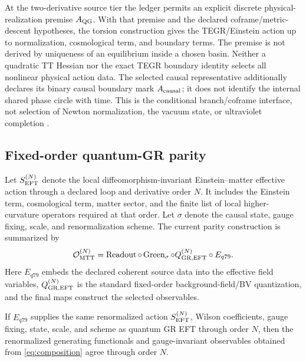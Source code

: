 \documentclass[11pt]{article}
\newcommand{\cO}{\mathcal{O}}
\begin{document}
At the two-derivative source tier the ledger permits an explicit discrete
physical-realization premise $A_{\rm QG}$. With that premise and the
declared coframe/metric-descent hypotheses, the torsion construction gives
the TEGR/Einstein action up to normalization, cosmological term, and
boundary terms. The premise is not derived by uniqueness of an equilibrium
inside a chosen basin. Neither a quadratic TT Hessian nor the exact
TEGR boundary identity selects all nonlinear physical action data.
The selected causal representative additionally declares its binary causal
boundary mark \(A_{\rm causal}\); it does not identify the internal shared
phase circle with time. This is the conditional branch/coframe interface,
not selection of Newton normalization, the vacuum state, or ultraviolet
completion \cite{FrozenQGStatus}.

\subsection{Fixed-order quantum-GR parity}

Let \(S_{\rm EFT}^{(N)}\) denote the local diffeomorphism-invariant
Einstein--matter effective action through a declared loop and derivative
order \(N\). It includes the Einstein term, cosmological term, matter sector,
and the finite list of local higher-curvature operators required at that
order. Let \(\sigma\) denote the causal state, gauge fixing, scale, and
renormalization scheme. The current parity construction is summarized by
\begin{equation}
 \cO_{\rm MTT}^{(N)}
 =
 \operatorname{Readout}\circ
 \operatorname{Green}_{\sigma}\circ
 Q_{\rm GR,EFT}^{(N)}\circ
 E_{q79}.
 \label{eq:composition}
\end{equation}
Here \(E_{q79}\) embeds the declared coherent source data into the effective
field variables, \(Q_{\rm GR,EFT}^{(N)}\) is the standard fixed-order
background-field/BV quantization, and the final maps construct the selected
observables.

\begin{proposition}
\label{prop:parity}
If \(E_{q79}\) supplies the same renormalized action
\(S_{\rm EFT}^{(N)}\), Wilson coefficients, gauge fixing, state, scale, and
scheme as quantum GR EFT through order \(N\), then the renormalized generating
functionals and gauge-invariant observables obtained from
\eqref{eq:composition} agree through order \(N\).
\end{proposition}
\end{document}
